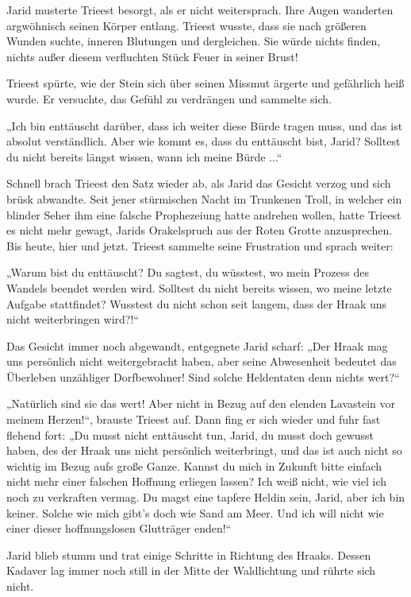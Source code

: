 Jarid musterte Trieest besorgt, als er nicht weitersprach. Ihre Augen wanderten argwöhnisch seinen Körper entlang. Trieest wusste, dass sie nach größeren Wunden suchte, inneren Blutungen und dergleichen. Sie würde nichts finden, nichts außer diesem verfluchten Stück Feuer in seiner Brust!

Trieest spürte, wie der Stein sich über seinen Missmut ärgerte und gefährlich heiß wurde. Er versuchte, das Gefühl zu verdrängen und sammelte sich.

„Ich bin enttäuscht darüber, dass ich weiter diese Bürde tragen muss, und das ist absolut verständlich. Aber wie kommt es, dass du enttäuscht bist, Jarid? Solltest du nicht bereits längst wissen, wann ich meine Bürde ...“

Schnell brach Trieest den Satz wieder ab, als Jarid das Gesicht verzog und sich brüsk abwandte. Seit jener stürmischen Nacht im Trunkenen Troll, in welcher ein blinder Seher ihm eine falsche Prophezeiung hatte andrehen wollen, hatte Trieest es nicht mehr gewagt, Jarids Orakelspruch aus der Roten Grotte anzusprechen. Bis heute, hier und jetzt. Trieest sammelte seine Frustration und sprach weiter:

„Warum bist du enttäuscht? Du sagtest, du wüsstest, wo mein Prozess des Wandels beendet werden wird. Solltest du nicht bereits wissen, wo meine letzte Aufgabe stattfindet? Wusstest du nicht schon seit langem, dass der Hraak uns nicht weiterbringen wird?!“

Das Gesicht immer noch abgewandt, entgegnete Jarid scharf: „Der Hraak mag uns persönlich nicht weitergebracht haben, aber seine Abwesenheit bedeutet das Überleben unzähliger Dorfbewohner! Sind solche Heldentaten denn nichts wert?“

„Natürlich sind sie das wert! Aber nicht in Bezug auf den elenden Lavastein vor meinem Herzen!“, brauste Trieest auf. Dann fing er sich wieder und fuhr fast flehend fort: „Du musst nicht enttäuscht tun, Jarid, du musst doch gewusst haben, des der Hraak uns nicht persönlich weiterbringt, und das ist auch nicht so wichtig im Bezug aufs große Ganze. Kannst du mich in Zukunft bitte einfach nicht mehr einer falschen Hoffnung erliegen lassen? Ich weiß nicht, wie viel ich noch zu verkraften vermag. Du magst eine tapfere Heldin sein, Jarid, aber ich bin keiner. Solche wie mich gibt’s doch wie Sand am Meer. Und ich will nicht wie einer dieser hoffnungslosen Glutträger enden!“

Jarid blieb stumm und trat einige Schritte in Richtung des Hraaks. Dessen Kadaver lag immer noch still in der Mitte der Waldlichtung und rührte sich nicht.

